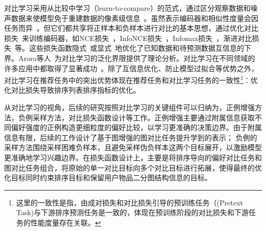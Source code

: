 \vspace{-0.0011cm}
对比学习采用从比较中学习（learn-to-compare）\cite{Gutmann:2010:ICAIS}的范式，通过区分观察数据和噪声数据来使模型免于重建数据的像素级信息~\cite{Oord:2018:arxiv}。虽然表示编码器和相似性度量会因任务而异~\cite{Devlin:2018:bert,He:2020:CVPR,Dosovitskiy:2014:NIPS,Xiangnan:2020:SIGIR,Wang:2019:SIGIR,Wenqi:2021:KDD}，但它们都共享将正样本和负样本进行对比的基本思想，通过优化对比损失~\cite{Wang:2020:ICML}来训练编码器，如NCE损失~\cite{Gutmann:2010:ICAIS}，InfoNCE损失~\cite{Oord:2018:arxiv}，Infomax损失~\cite{Hjelm:2018:Arxiv}，渐进对比损失~\cite{Wang:2020:ICML}等。这些损失函数隐式~\cite{Oord:2018:arxiv}或显式~\cite{Hjelm:2018:Arxiv}地优化了已知数据和待预测数据互信息的下界。Arora等人~\cite{Saunshi:2019:ICML}为对比学习的泛化界限提供了理论分析。对比学习在不同领域的许多应用中都取得了显著成功~\cite{Henaff:2020:ICML,Khosla:2020:NIPS,Liu:2021:TKDE,Bachman:2019:NIPS,chen2020improved,Huang:2019:ICML,Wu:2018:CVPR,Zhuang:2019:CVPR}。除了互信息优化、防止模型过拟合等优势之外，对比学习在推荐任务中的突出优势体现在推荐任务和对比学习任务的一致性\footnote{这里的一致性是指，由成对损失和对比损失引导的预训练任务（(Pretext Task)与下游排序预测任务是一致的，体现在预训练阶段的对比损失和下游任务的性能度量存在关联。}：优化对比损失导致排序列表排序指标的优化\cite{Steffen:2009:UAI,Jiancan:2022:arxiv}。

\vspace{-0.0011cm}
从对比学习的视角，后续的研究按照对比学习的关键组件可以归纳为，正例增强方法，负例采样方法，对比损失函数设计等工作。正例增强主要通过附属信息获取不同偏好强度的正例\cite{Qiu:2018:IS,Lerche:2014:RS,Wenhui:2019:WWW,Yu:2018:CIKM,Bin:2020:IS}构造更细粒度的偏好比较，以学习更准确的决策边界。由于附属信息有限，后续的工作设计了基于图增强的图对比任务提升学到的表示\cite{lightgcl:2023:ICLR,ren2023disentangled,he2023candidate,yang2023generative}；
负例的采样方法围绕采样困难负样本\cite{Steffen:2014:WSDM,Zhang:2013:SIGIR,Zhao:2015:CIKM,shi2023theories}，且避免采样伪负样本\cite{Ding:2020:NIPS,Qin:2021:AAAI,Zhao:2021:IJCAI,Chen:2017:KDD,Mikolov:2013:NIPS,Weike:2013:IJCAI,Yu:2018:CIKM,Wang:2019:SIGIR}这两个目标展开，以激励模型更准确地学习兴趣边界。在损失函数设计上，主要是将排序导向的偏好对比任务和图对比任务组合，将原始的单一对比目标向多个对比目标进行拓展，使得最终的优化目标同时约束排序目标和保留用户物品二分图结构信息的目标\cite{Wang:2022:KDD,ren2023disentangled,lightgcl:2023:ICLR,he2023candidate,zhu2023adamcl,qin2023meta,shuai2022review}。


